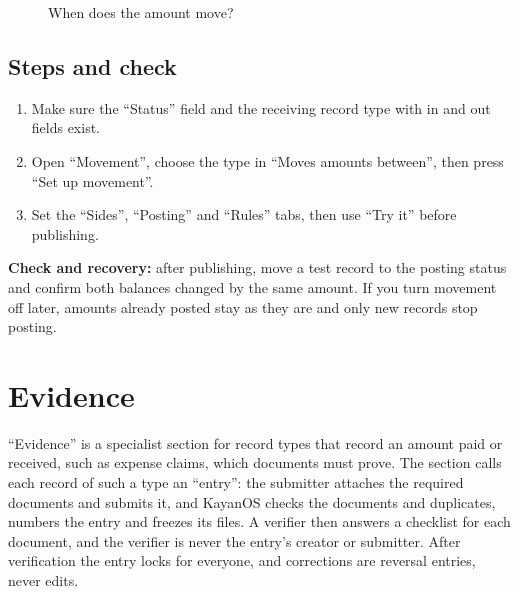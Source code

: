 \begin{figure}[H]
\centering
{}
\rclegend
\caption{When does the amount move?}
\label{fig:builder-movement-flow}
\end{figure}

\subsection{Steps and check}
\begin{enumerate}
\item Make sure the “Status” field and the receiving record type with in and out fields exist.
\item Open “Movement”, choose the type in “Moves amounts between”, then press “Set up movement”.
\item Set the “Sides”, “Posting” and “Rules” tabs, then use “Try it” before publishing.
\end{enumerate}

\textbf{Check and recovery:} after publishing, move a test record to the posting status and confirm both balances changed by the same amount. If you turn movement off later, amounts already posted stay as they are and only new records stop posting.

\clearpage
\section{Evidence}
\label{sec:builder-feature-evidence}

“Evidence” is a specialist section for record types that record an amount paid or received, such as expense claims, which documents must prove. The section calls each record of such a type an “entry”: the submitter attaches the required documents and submits it, and KayanOS checks the documents and duplicates, numbers the entry and freezes its files. A verifier then answers a checklist for each document, and the verifier is never the entry's creator or submitter. After verification the entry locks for everyone, and corrections are reversal entries, never edits.

